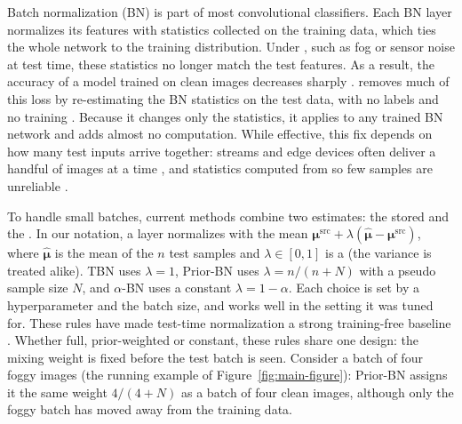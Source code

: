 Batch normalization (BN) \cite{BatchNorm} is part of most convolutional classifiers.
Each BN layer normalizes its features with statistics collected on the training data, which ties the whole network to the training distribution.
Under  \cite{BN-Adapt}, such as fog or sensor noise at test time, these statistics no longer match the test features.
As a result, the accuracy of a model trained on clean images decreases sharply \cite{CIFAR10-C}.
 \cite{AlphaBN} removes much of this loss by re-estimating the BN statistics on the test data, with no labels and no training \cite{PredictionBN, BN-Adapt}.
Because it changes only the statistics, it applies to any trained BN network and adds almost no computation.
While effective, this fix depends on how many test inputs arrive together: streams and edge devices often deliver a handful of images at a time \cite{NOTE, SAR}, and statistics computed from so few samples are unreliable \cite{BN-Adapt}.

To handle small batches, current methods combine two estimates: the stored  \cite{BN-Adapt} and the  \cite{UnMix-TNS}.
In our notation, a layer normalizes with the mean $\boldsymbol{\mu}^{\text{src}} + \lambda(\hat{\boldsymbol{\mu}} - \boldsymbol{\mu}^{\text{src}})$, where $\hat{\boldsymbol{\mu}}$ is the mean of the $n$ test samples and $\lambda \in [0,1]$ is a  (the variance is treated alike).
TBN \cite{PredictionBN} uses $\lambda{=}1$, Prior-BN \cite{BN-Adapt} uses $\lambda{=}n/(n{+}N)$ with a pseudo sample size $N$, and $\alpha$-BN \cite{AlphaBN} uses a constant $\lambda{=}1{-}\alpha$.
Each choice is set by a hyperparameter and the batch size, and works well in the setting it was tuned for.
These rules have made test-time normalization a strong training-free baseline \cite{TENT}.
Whether full, prior-weighted or constant, these rules share one design: the mixing weight is fixed before the test batch is seen.
Consider a batch of four foggy images (the running example of Figure~\ref{fig:main-figure}): Prior-BN assigns it the same weight $4/(4{+}N)$ as a batch of four clean images, although only the foggy batch has moved away from the training data.

